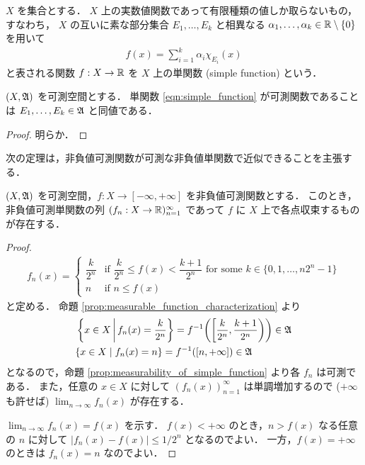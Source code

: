 \begin{definition}
    $X$ を集合とする．
    $X$ 上の実数値関数であって有限種類の値しか取らないもの，すなわち，
    $X$ の互いに素な部分集合 $E_1,\ldots,E_k$ と相異なる $\alpha_1,\ldots,\alpha_k\in\mathbb{R}\setminus\{0\}$ を用いて
    \begin{align}
        f(x)=\sum_{i=1}^k\alpha_i\chi_{E_i}(x)
        \label{eqn:simple_function}
    \end{align}
    と表される関数 $f:X\to\mathbb{R}$ を $X$ 上の単関数 (simple function) という．
\end{definition}

\begin{proposition}\label{prop:measurability_of_simple_function}
    $(X,\mathfrak{A})$ を可測空間とする．
    単関数 \eqref{eqn:simple_function} が可測関数であることは $E_1,\ldots,E_k\in\mathfrak{A}$ と同値である．
\end{proposition}

\begin{proof}
    明らか．
\end{proof}

次の定理は，非負値可測関数が可測な非負値単関数で近似できることを主張する．

\begin{theorem}\label{thm:approx_measurable_by_simple}
    $(X,\mathfrak{A})$ を可測空間，$f:X\to[-\infty,+\infty]$ を非負値可測関数とする．
    このとき，非負値可測単関数の列 $(f_n:X\to\mathbb{R})_{n=1}^\infty$ であって $f$ に $X$ 上で各点収束するものが存在する．
\end{theorem}

\begin{proof}
    \begin{align*}
        f_n(x)=\begin{cases}
            \dfrac{k}{2^n}&\text{if $\dfrac{k}{2^n}\le f(x)<\dfrac{k+1}{2^n}$ for some $k\in\{0,1,\ldots,n2^n-1\}$}\\
            n&\text{if $n\le f(x)$}
        \end{cases}
    \end{align*}
    と定める．
    命題 \ref{prop:measurable_function_characterization} より
    \begin{align*}
        &\left\{x\in X\,\middle\vert\,f_n(x)=\dfrac{k}{2^n}\right\}
        =f^{-1}\biggl(\biggl[\dfrac{k}{2^n},\dfrac{k+1}{2^n}\biggr)\biggr)\in\mathfrak{A}\\
        &\{x\in X\mid f_n(x)=n\}=f^{-1}([n,+\infty])\in\mathfrak{A}
    \end{align*}
    となるので，命題 \ref{prop:measurability_of_simple_function} より各 $f_n$ は可測である．
    また，任意の $x\in X$ に対して $(f_n(x))_{n=1}^\infty$ は単調増加するので
    ($+\infty$ も許せば) $\displaystyle\lim_{n\to\infty}f_n(x)$ が存在する．

    $\displaystyle\lim_{n\to\infty}f_n(x)=f(x)$ を示す．
    $f(x)<+\infty$ のとき，$n>f(x)$ なる任意の $n$ に対して $|f_n(x)-f(x)|\le1/2^n$ となるのでよい．
    一方，$f(x)=+\infty$ のときは $f_n(x)=n$ なのでよい．
\end{proof}

